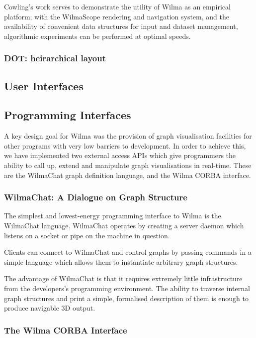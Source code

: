 \documentclass[runningheads]{cl2emult}
\begin{document}
Cowling's work serves to demonstrate the utility of Wilma as an empirical
platform; with the WilmaScope rendering and navigation system, and the
availability of convenient data structures for input and dataset management,
algorithmic experiments can be performed at optimal speeds.

\subsubsection{DOT: heirarchical layout}
\subsection{User Interfaces}
\subsection{Programming Interfaces}
\label{API}

A key design goal for Wilma was the provision of graph visualisation
facilities for other programs with very low barriers to development.  In order
to achieve this, we have implemented two external access APIs which give
programmers the ability to call up, extend and manipulate graph visualisations
in real-time.  These are the WilmaChat graph definition language, and the
Wilma CORBA interface.

\subsubsection{WilmaChat: A Dialogue on Graph Structure}

The simplest and lowest-energy programming interface to Wilma is the WilmaChat
language.  WilmaChat operates by creating a server daemon which listens on a
socket or pipe on the machine in question.

Clients can connect to WilmaChat and control graphs by passing commands
in a simple language which allows them to instantiate arbitrary graph
structures.

The advantage of WilmaChat is that it requires extremely little infrastructure
from the developers's programming environment.  The ability to traverse
internal graph structures and print a simple, formalised description of them
is enough to produce navigable 3D output.

\subsubsection{The Wilma CORBA Interface}
\end{document}
